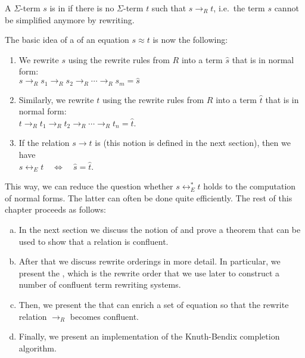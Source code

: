 \begin{Definition}
  A $\Sigma$-term $s$ is in  if there is no $\Sigma$-term $t$ such that $s \rightarrow_R t$,
  i.e.~the term $s$ cannot be simplified anymore by rewriting. \eod
\end{Definition}
The basic idea of a  of an equation $s \approx t$ is now the following:
\begin{enumerate}
\item We rewrite $s$ using the rewrite rules from $R$ into a term $\widehat{s}$ that is in normal form:
      \\[0.2cm]
      \hspace*{1.3cm}
      $s \rightarrow_R s_1 \rightarrow_R s_2 \rightarrow_R \cdots \rightarrow_R s_m = \widehat{s}$
\item Similarly, we rewrite $t$ using the rewrite rules from $R$ into a term $\widehat{t}$ that is in normal form:
      \\[0.2cm]
      \hspace*{1.3cm}
      $t \rightarrow_R t_1 \rightarrow_R t_2 \rightarrow_R \cdots \rightarrow_R t_n = \widehat{t}$.
\item If the relation $s \rightarrow t$ is  (this notion is defined in the next section),
      then we have 
      \\[0.2cm]
      \hspace*{1.3cm}
      $s \leftrightarrow_E t \quad \Leftrightarrow \quad \widehat{s} = \widehat{t}$.
\end{enumerate}
This way, we can reduce the question whether $s \leftrightarrow_E^* t$ holds to the computation of normal
forms.  The latter can often be done quite efficiently.  The rest of this chapter proceeds as follows:
\begin{enumerate}[(a)]
\item In the next section we discuss the notion of   and prove a theorem that can be used
      to show that a relation is confluent.
\item After that we discuss rewrite orderings in more detail.  In particular, we present the ,
      which is the rewrite order that we use later to construct a number of confluent term rewriting systems.
\item Then, we present the  that can enrich a set of equation so that
      the rewrite relation $\rightarrow_R$ becomes confluent.
\item Finally, we present an implementation of the Knuth-Bendix completion algorithm.  
\end{enumerate}

